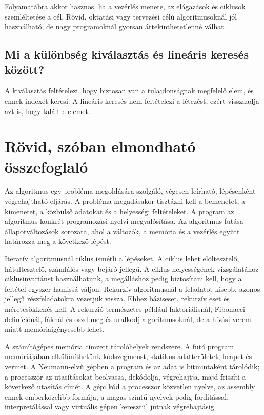 Folyamatábra akkor hasznos, ha a vezérlés menete, az elágazások és ciklusok szemléltetése a cél. Rövid, oktatási vagy tervezési célú algoritmusoknál jól használható, de nagy programoknál gyorsan áttekinthetetlenné válhat.

\subsection{Mi a különbség kiválasztás és lineáris keresés között?}

A kiválasztás feltételezi, hogy biztosan van a tulajdonságnak megfelelő elem, és ennek indexét keresi. A lineáris keresés nem feltételezi a létezést, ezért visszaadja azt is, hogy talált-e elemet.

\section{Rövid, szóban elmondható összefoglaló}

Az algoritmus egy probléma megoldására szolgáló, végesen leírható, lépésenként végrehajtható eljárás. A probléma megadásakor tisztázni kell a bemenetet, a kimenetet, a közbülső adatokat és a helyességi feltételeket. A program az algoritmus konkrét programozási nyelvi megvalósítása. Az algoritmus futása állapotváltozások sorozata, ahol a változók, a memória és a vezérlés együtt határozza meg a következő lépést.

Iteratív algoritmusnál ciklus ismétli a lépéseket. A ciklus lehet elöltesztelő, hátultesztelő, számlálós vagy bejáró jellegű. A ciklus helyességének vizsgálatához ciklusinvariánst használhatunk, a megálláshoz pedig biztosítani kell, hogy a feltétel egyszer hamissá váljon. Rekurzív algoritmusnál a feladatot kisebb, azonos jellegű részfeladatokra vezetjük vissza. Ehhez báziseset, rekurzív eset és méretcsökkenés kell. A rekurzió természetes például faktoriálisnál, Fibonacci-definíciónál, fáknál és oszd meg és uralkodj algoritmusoknál, de a hívási verem miatt memóriaigényesebb lehet.

A számítógépes memória címzett tárolóhelyek rendszere. A futó program memóriájában elkülöníthetünk kódszegmenst, statikus adatterületet, heapet és vermet. A Neumann-elvű gépben a program és az adat is bitmintaként tárolódik; a processzor az utasításokat beolvassa, dekódolja, végrehajtja, majd frissíti a következő utasítás címét. A gépi kód a processzor közvetlen nyelve, az assembly ennek emberközelibb formája, a magas szintű nyelvek pedig fordítással, interpretálással vagy virtuális gépen keresztül jutnak végrehajtásig.

